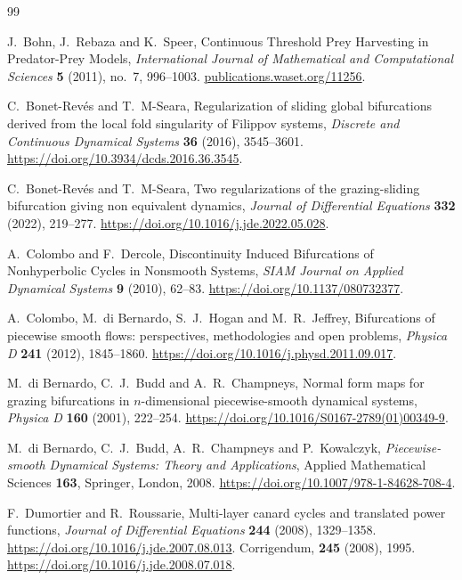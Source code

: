 \begin{thebibliography}{99}
\setlength{\itemsep}{1pt}

J.~Bohn, J.~Rebaza and K.~Speer,
Continuous Threshold Prey Harvesting in Predator-Prey Models,
\emph{International Journal of Mathematical and Computational Sciences}
\textbf{5} (2011), no.~7, 996--1003.
\href{https://publications.waset.org/11256/continuous-threshold-prey-harvesting-in-predator-prey-models}{publications.waset.org/11256}.

C.~Bonet-Rev\'es and T.~M-Seara,
Regularization of sliding global bifurcations derived from the local fold
singularity of Filippov systems,
\emph{Discrete and Continuous Dynamical Systems}
\textbf{36} (2016), 3545--3601.
\url{https://doi.org/10.3934/dcds.2016.36.3545}.

C.~Bonet-Rev\'es and T.~M-Seara,
Two regularizations of the grazing-sliding bifurcation giving non
equivalent dynamics,
\emph{Journal of Differential Equations}
\textbf{332} (2022), 219--277.
\url{https://doi.org/10.1016/j.jde.2022.05.028}.

A.~Colombo and F.~Dercole,
Discontinuity Induced Bifurcations of Nonhyperbolic Cycles in
Nonsmooth Systems,
\emph{SIAM Journal on Applied Dynamical Systems}
\textbf{9} (2010), 62--83.
\url{https://doi.org/10.1137/080732377}.

A.~Colombo, M.~di Bernardo, S.~J.~Hogan and M.~R.~Jeffrey,
Bifurcations of piecewise smooth flows: perspectives, methodologies and open
problems,
\emph{Physica D} \textbf{241} (2012), 1845--1860.
\url{https://doi.org/10.1016/j.physd.2011.09.017}.

M.~di Bernardo, C.~J.~Budd and A.~R.~Champneys,
Normal form maps for grazing bifurcations in \(n\)-dimensional
piecewise-smooth dynamical systems,
\emph{Physica D} \textbf{160} (2001), 222--254.
\url{https://doi.org/10.1016/S0167-2789(01)00349-9}.

M.~di Bernardo, C.~J.~Budd, A.~R.~Champneys and P.~Kowalczyk,
\emph{Piecewise-smooth Dynamical Systems: Theory and Applications},
Applied Mathematical Sciences \textbf{163}, Springer, London, 2008.
\url{https://doi.org/10.1007/978-1-84628-708-4}.

F.~Dumortier and R.~Roussarie,
Multi-layer canard cycles and translated power functions,
\emph{Journal of Differential Equations} \textbf{244} (2008), 1329--1358.
\url{https://doi.org/10.1016/j.jde.2007.08.013}.
Corrigendum, \textbf{245} (2008), 1995.
\url{https://doi.org/10.1016/j.jde.2008.07.018}.


\end{thebibliography}
